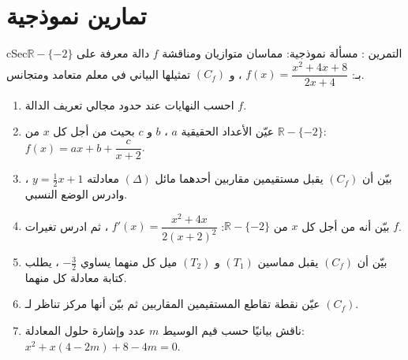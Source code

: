 \documentclass[12pt,a4paper]{article}
\newenvironment{BOX}[2]{\begin{otherlanguage}{english}\begin{arbox}{#1}{#2}}{\end{arbox}\end{otherlanguage}}
\newcounter{exo}
\newenvironment{tamrin}[1]{\stepcounter{exo}\begin{BOX}{cSec}{التمرين \theexo: #1}}{\end{BOX}}
\newcommand{\R}{\mathbb{R}}
\begin{document}
\section{تمارين نموذجية}
\begin{tamrin}{مسألة نموذجية: مماسان متوازيان ومناقشة}
$f$ دالة معرفة على $\R-\{-2\}$ بـ: $f(x)=\dfrac{x^2+4x+8}{2x+4}$ ، و $(C_f)$ تمثيلها البياني في معلم متعامد ومتجانس.
\begin{enumerate}
\item احسب النهايات عند حدود مجالي تعريف الدالة $f$.
\item عيّن الأعداد الحقيقية $a$ ، $b$ و $c$ بحيث من أجل كل $x$ من $\R-\{-2\}$: $f(x)=ax+b+\dfrac{c}{x+2}$.
\item بيّن أن $(C_f)$ يقبل مستقيمين مقاربين أحدهما مائل $(\Delta)$ معادلته $y=\frac12x+1$ ، وادرس الوضع النسبي.
\item بيّن أنه من أجل كل $x$ من $\R-\{-2\}$: $f'(x)=\dfrac{x^2+4x}{2(x+2)^2}$ ، ثم ادرس تغيرات $f$.
\item بيّن أن $(C_f)$ يقبل مماسين $(T_1)$ و $(T_2)$ ميل كل منهما يساوي $-\frac32$ ، يطلب كتابة معادلة كل منهما.
\item عيّن نقطة تقاطع المستقيمين المقاربين ثم بيّن أنها مركز تناظر لـ $(C_f)$.
\item ناقش بيانيًا حسب قيم الوسيط $m$ عدد وإشارة حلول المعادلة: $x^2+x(4-2m)+8-4m=0$.
\end{enumerate}
\end{tamrin}
\end{document}
